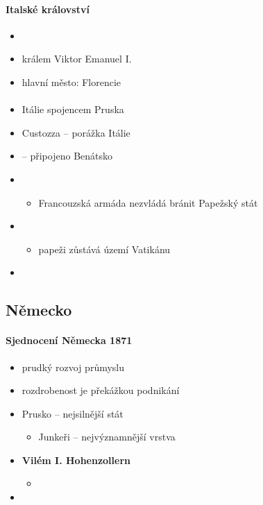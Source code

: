 \paragraph{Italské království}
\begin{itemize}
\item {}
\item králem Viktor Emanuel \ra I.
\item hlavní město: Florencie
\end{itemize}

\paragraph{}
\begin{itemize}
\item Itálie spojencem Pruska
\item Custozza -- porážka Itálie
\item {} -- připojeno Benátsko
\item {}
	\begin{itemize}
	\item Francouzská armáda nezvládá bránit Papežský stát
	\end{itemize}
\item {}
	\begin{itemize}
	\item papeži zůstává území Vatikánu
	\end{itemize}
\item {}
\end{itemize}

\subsection{Německo}
\paragraph{Sjednocení Německa 1871}
\begin{itemize}
\item prudký rozvoj průmyslu
\item rozdrobenost je překážkou podnikání
\item Prusko -- nejsilnější stát
	\begin{itemize}
	\item Junkeři -- nejvýznamnější vrstva
	\end{itemize}
\item \textbf{Vilém I. Hohenzollern}
	\begin{itemize}
	\item 
	\end{itemize}
\item {}
\end{itemize}

